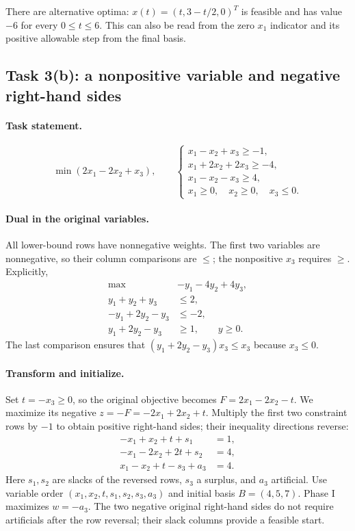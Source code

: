 \documentclass[11pt,a4paper]{article}
\begin{document}
There are alternative optima: $x(t)=(t,3-t/2,0)^T$ is feasible and has
value $-6$ for every $0\leq t\leq6$. This can also be read from the zero
$x_1$ indicator and its positive allowable step from the final basis.

\subsection{Task 3(b): a nonpositive variable and negative right-hand sides}
\paragraph{Task statement.}
\[
  \min(2x_1-2x_2+x_3),\qquad
  \begin{cases}
    x_1-x_2+x_3\geq-1,   \\
    x_1+2x_2+2x_3\geq-4, \\
    x_1-x_2-x_3\geq4,    \\
    x_1\geq0,\quad x_2\geq0,\quad x_3\leq0.
  \end{cases}
\]
\paragraph{Dual in the original variables.}
All lower-bound rows have nonnegative weights. The first two variables are
nonnegative, so their column comparisons are $\leq$; the nonpositive $x_3$
requires $\geq$. Explicitly,
\[
  \begin{aligned}
    \max\quad&-y_1-4y_2+4y_3,\\
    y_1+y_2+y_3&\leq2,\\
    -y_1+2y_2-y_3&\leq-2,\\
    y_1+2y_2-y_3&\geq1,\qquad y\geq0.
  \end{aligned}
\]
The last comparison ensures that
$(y_1+2y_2-y_3)x_3\leq x_3$ because $x_3\leq0$.

\paragraph{Transform and initialize.}
Set $t=-x_3\geq0$, so the original objective becomes
$F=2x_1-2x_2-t$. We maximize its negative $z=-F=-2x_1+2x_2+t$.
Multiply the first two constraint rows by $-1$ to obtain positive
right-hand sides; their inequality directions reverse:
\[
  \begin{aligned}
    -x_1+x_2+t+s_1&=1,\\
    -x_1-2x_2+2t+s_2&=4,\\
    x_1-x_2+t-s_3+a_3&=4.
  \end{aligned}
\]
Here $s_1,s_2$ are slacks of the reversed rows, $s_3$ a surplus, and
$a_3$ artificial. Use variable order $(x_1,x_2,t,s_1,s_2,s_3,a_3)$ and
initial basis $B=(4,5,7)$. Phase I maximizes $w=-a_3$.
The two negative original right-hand sides do not require artificials after
the row reversal; their slack columns provide a feasible start.
\end{document}
